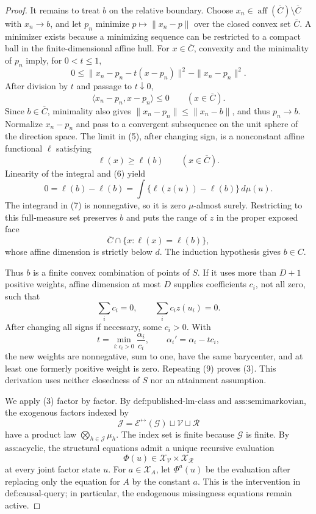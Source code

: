 \documentclass{article}
\begin{document}
\begin{proof}
It remains to treat \(b\) on the relative boundary. Choose \(x_n\in\operatorname{aff}(\overline C)\setminus\overline C\) with \(x_n\to b\), and let \(p_n\) minimize \(p\mapsto\|x_n-p\|\) over the closed convex set \(\overline C\). A minimizer exists because a minimizing sequence can be restricted to a compact ball in the finite-dimensional affine hull. For \(x\in\overline C\), convexity and the minimality of \(p_n\) imply, for \(0<t\leq1\),
\[
0\leq
\|x_n-p_n-t(x-p_n)\|^2-\|x_n-p_n\|^2.
\]
After division by \(t\) and passage to \(t\downarrow0\),
\[
\langle x_n-p_n,x-p_n\rangle\leq0
\qquad(x\in\overline C).
\tag{5}
\]
Since \(b\in\overline C\), minimality also gives \(\|x_n-p_n\|\leq\|x_n-b\|\), and thus \(p_n\to b\). Normalize \(x_n-p_n\) and pass to a convergent subsequence on the unit sphere of the direction space. The limit in (5), after changing sign, is a nonconstant affine functional \(\ell\) satisfying
\[
\ell(x)\geq\ell(b)
\qquad(x\in\overline C).
\tag{6}
\]
Linearity of the integral and (6) yield
\[
0=\ell(b)-\ell(b)
=\int\{\ell(z(u))-\ell(b)\}\,d\mu(u).
\tag{7}
\]
The integrand in (7) is nonnegative, so it is zero \(\mu\)-almost surely. Restricting to this full-measure set preserves \(b\) and puts the range of \(z\) in the proper exposed face
\[
\overline C\cap\{x:\ell(x)=\ell(b)\},
\]
whose affine dimension is strictly below \(d\). The induction hypothesis gives \(b\in C\).

Thus \(b\) is a finite convex combination of points of \(S\). If it uses more than \(D+1\) positive weights, affine dimension at most \(D\) supplies coefficients \(c_i\), not all zero, such that
\[
\sum_i c_i=0,
\qquad
\sum_i c_i z(u_i)=0.
\tag{8}
\]
After changing all signs if necessary, some \(c_i>0\). With
\[
t=\min_{i:c_i>0}\frac{\alpha_i}{c_i},
\qquad
\alpha_i'=\alpha_i-tc_i,
\tag{9}
\]
the new weights are nonnegative, sum to one, have the same barycenter, and at least one formerly positive weight is zero. Repeating (9) proves (3). This derivation uses neither closedness of \(S\) nor an attainment assumption.

We apply (3) factor by factor. By \(\text{def:published-lm-class}\) and \(\text{ass:semimarkovian}\), the exogenous factors indexed by
\[
\mathcal J=\mathcal E^{\leftrightarrow}(\mathcal G)\sqcup\mathcal V\sqcup\mathcal R
\]
have a product law \(\bigotimes_{h\in\mathcal J}\mu_h\). The index set is finite because \(\mathcal G\) is finite. By \(\text{ass:acyclic}\), the structural equations admit a unique recursive evaluation
\[
\Phi(u)\in\mathcal X_{\mathcal V}\times\mathcal X_{\mathcal R}
\]
at every joint factor state \(u\). For \(a\in\mathcal X_A\), let \(\Phi^a(u)\) be the evaluation after replacing only the equation for \(A\) by the constant \(a\). This is the intervention in \(\text{def:causal-query}\); in particular, the endogenous missingness equations remain active.


\end{proof}
\end{document}
